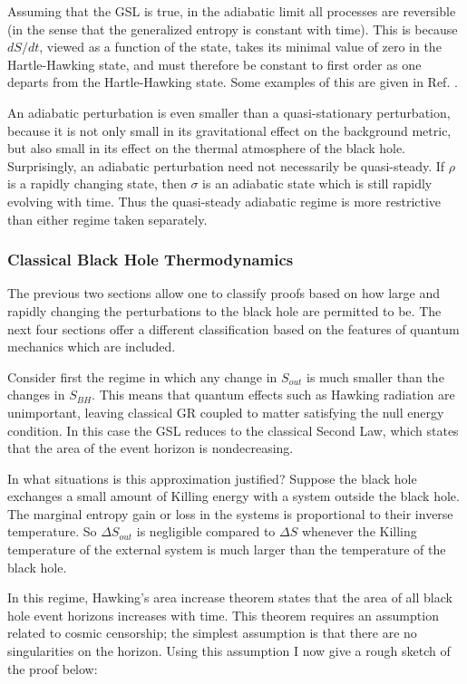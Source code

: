\documentclass{article}
\begin{document}
Assuming that the GSL is true, in the adiabatic limit all processes are reversible (in the sense that the generalized entropy is constant with time).  This is because $dS/dt$, viewed as a function of the state, takes its minimal value of zero in the Hartle-Hawking state, and must therefore be constant to first order as one departs from the Hartle-Hawking state.  Some examples of this are given in Ref. \cite{bek98}.

An adiabatic perturbation is even smaller than a quasi-stationary perturbation, because it is not only small in its gravitational effect on the background metric, but also small in its effect on the thermal atmosphere of the black hole.  Surprisingly, an adiabatic perturbation need not necessarily be quasi-steady.  If $\rho$ is a rapidly changing state, then $\sigma$
is an adiabatic state which is still rapidly evolving with time.  Thus the quasi-steady adiabatic regime is more restrictive than either regime taken separately.

\subsubsection{Classical Black Hole Thermodynamics}\label{class}

The previous two sections allow one to classify proofs based on how large and rapidly changing the perturbations to the black hole are permitted to be.  The next four sections offer a different classification based on the features of quantum mechanics which are included.

Consider first the regime in which any change in $S_{out}$ is much smaller than the changes in $S_{BH}$.  This means that quantum effects such as Hawking radiation are unimportant, leaving classical GR coupled to matter satisfying the null energy condition.  In this case the GSL reduces to the classical Second Law, which states that the area of the event horizon is nondecreasing.

In what situations is this approximation justified?  Suppose the black hole exchanges a small amount of Killing energy with a system outside the black hole.  The marginal entropy gain or loss in the systems is proportional to their inverse temperature.  So $\Delta S_{out}$ is negligible compared to $\Delta S$ whenever the Killing temperature of the external system is much larger than the temperature of the black hole.

In this regime, Hawking's area increase theorem \cite{hawking71} states that the area of all black hole event horizons increases with time.  This theorem requires an assumption related to cosmic censorship; the simplest assumption is that there are no singularities on the horizon.  Using this assumption I now give a rough sketch of the proof below:
\end{document}

